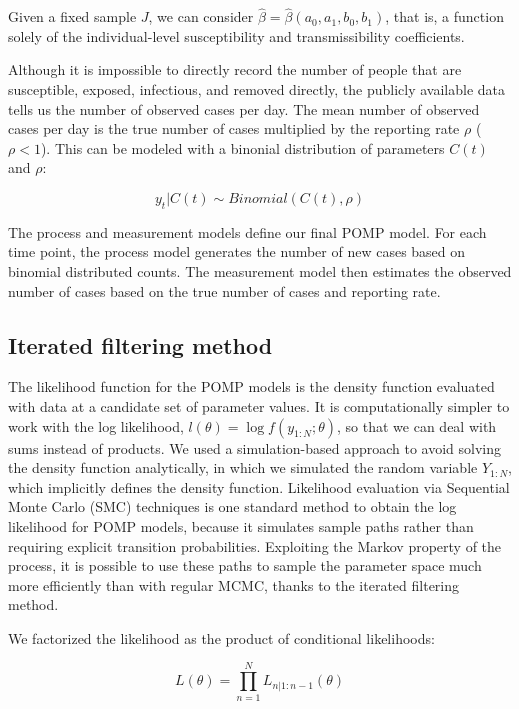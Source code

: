\documentclass{article}
\begin{document}
Given a fixed sample $J$, we can consider $\hat{\beta}=\hat{\beta}(a_0, a_1, b_0, b_1)$, that is, a function solely of the individual-level susceptibility and transmissibility coefficients.

Although it is impossible to directly record the number of people that are susceptible, exposed, infectious, and removed directly, the publicly available data tells us the number of observed cases per day. The mean number of observed cases per day is the true number of cases multiplied by the reporting rate $\rho$ ($\rho<1$). This can be modeled with a binonial distribution of parameters $C(t)$ and $\rho$:

\begin{equation}
y_t|C(t) \sim Binomial(C(t), \rho)
\end{equation}

The process and measurement models define our final POMP model. For each time point, the process model generates the number of new cases based on binomial distributed counts. The measurement model then estimates the observed number of cases based on the true number of cases and reporting rate. 

\subsection{Iterated filtering method}

The likelihood function for the POMP models is the density function evaluated with data at a candidate set of parameter values. It is computationally simpler to work with the log likelihood, $l(\theta)=\log f(y_{1:N};\theta)$, so that we can deal with sums instead of products. We used a simulation-based approach to avoid solving the density function analytically, in which we simulated the random variable $Y_{1:N}$, which implicitly defines the density function. Likelihood evaluation via Sequential Monte Carlo (SMC) techniques is one standard method to obtain the log likelihood for POMP models, because it simulates sample paths rather than requiring explicit transition probabilities. Exploiting the Markov property of the process, it is possible to use these paths to sample the parameter space much more efficiently than with regular MCMC, thanks to the iterated filtering method.

We factorized the likelihood as the product of conditional likelihoods:

\begin{equation}
L(\theta)=\prod\limits_{n=1}^N L_{n|1:n-1}(\theta)
\end{equation}
\end{document}
